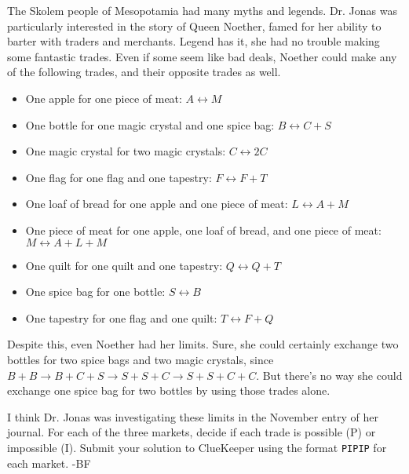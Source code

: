 The Skolem people of Mesopotamia had many myths and legends.
Dr. Jonas was particularly interested in the story of Queen Noether,
famed for her ability to barter with traders and merchants. Legend has it,
she had no trouble making some fantastic trades. Even if some
seem like bad deals, Noether could make any of the following trades,
and their opposite trades as well.

\begin{itemize}
\item One apple for one piece of meat:
  \(A\leftrightarrow M\)
\item One bottle for one magic crystal and one spice bag:
  \(B\leftrightarrow C+S\)
\item One magic crystal for two magic crystals:
  \(C\leftrightarrow 2C\)
\item One flag for one flag and one tapestry:
  \(F\leftrightarrow F+T\)
\item One loaf of bread for one apple and one piece of meat:
  \(L\leftrightarrow A+M\)
\item One piece of meat for one apple, one loaf of bread, and one piece of meat:
  \(M\leftrightarrow A+L+M\)
\item One quilt for one quilt and one tapestry:
  \(Q\leftrightarrow Q+T\)
\item One spice bag for one bottle:
  \(S\leftrightarrow B\)
\item One tapestry for one flag and one quilt:
  \(T\leftrightarrow F+Q\)
\end{itemize}

Despite this, even Noether had her limits. Sure, she could certainly exchange
two bottles for two spice bags and two magic crystals, since
\(B+B\rightarrow B+C+S\rightarrow S+S+C\rightarrow S+S+C+C\). But there's no
way she could exchange one spice bag for two bottles by using those
trades alone.

I think Dr. Jonas was investigating these limits in the November entry of her journal.
For each of the three markets, decide if each trade is possible (P) or impossible
(I). Submit your solution to ClueKeeper using the format \texttt{PIPIP} for
each market. -BF

